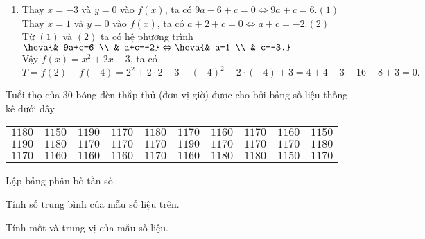 \begin{bt}
{\begin{enumerate}
			\item Thay $x=-3$ và $y=0$ vào $f(x)$, ta có $9a-6+c=0\Leftrightarrow9a+c=6$.\hfill$(1)$\\
			Thay $x=1$ và $y=0$ vào $f(x)$, ta có $a+2+c=0\Leftrightarrow a+c=-2$.\hfill$(2)$\\
			Từ $(1)$ và $(2)$ ta có hệ phương trình $\heva{& 9a+c=6 \\ & a+c=-2}\Leftrightarrow\heva{& a=1 \\ & c=-3.}$\\
			Vậy $f(x)=x^2+2x-3$, ta có
			\[
			T=f(2)-f(-4)=2^2+2\cdot2-3-(-4)^2-2\cdot(-4)+3=4+4-3-16+8+3=0.
			\]
		\end{enumerate}
	}
\end{bt}

\begin{bt}%
Tuổi thọ của $30$ bóng đèn thắp thử (đơn vị giờ) được cho bởi bảng số liệu thống kê dưới đây
\begin{center}\begin{tabular}{|cccccccccc|}
\hline
$1180$ & $1150$ & $1190$ & $1170$ & $1180$ & $1170$ & $1160$ & $1170$ & $1160$ & $1150$ \\
$1190$ & $1180$ & $1170$ & $1170$ & $1170$ & $1190$ & $1170$ & $1170$ & $1170$ & $1180$
 \\
$1170$ & $1160$ & $1160$ & $1160$ & $1170$ & $1160$ & $1180$ & $1180$ & $1150$ & $1170$ 
 \\
\hline
\end{tabular}
\end{center}
\begin{listEX}
\item Lập bảng phân bố tần số.
\item Tính số trung bình của mẫu số liệu trên.
\item Tính mốt và trung vị của mẫu số liệu.
\end{listEX}
\end{bt}

